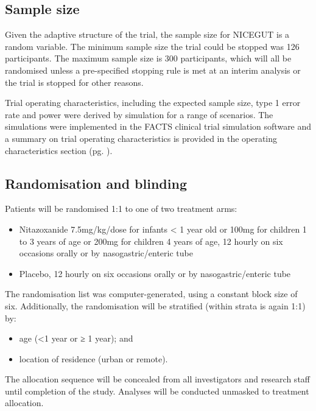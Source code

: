 \documentclass[a4paper]{article}
\begin{document}
\subsection{Sample size}

Given the adaptive structure of the trial, the sample size for NICEGUT is a random variable.
The minimum sample size the trial could be stopped was 126 participants.
The maximum sample size is 300 participants, which will all be randomised unless a pre-specified stopping rule is met at an interim analysis or the trial is stopped for other reasons.

Trial operating characteristics, including the expected sample size, type 1 error rate and power were derived by simulation for a range of scenarios.
The simulations were implemented in the FACTS \cite{facts} clinical trial simulation software and a summary on trial operating characteristics is provided in the operating characteristics section (pg. \pageref{summary-of-operating-characteristics}).

\subsection{Randomisation and blinding}

Patients will be randomised 1:1 to one of two treatment arms: 

\begin{itemize}
    \item Nitazoxanide 7.5mg/kg/dose for infants < 1 year old or 100mg for children 1 to 3 years of age or 200mg for children 4 years of age, 12 hourly on six occasions orally or by nasogastric/enteric tube
    \item Placebo, 12 hourly on six occasions orally or by nasogastric/enteric tube
\end{itemize}

The randomisation list was computer-generated, using a constant block size of six.
Additionally, the randomisation will be stratified (within strata is again 1:1) by:

\begin{itemize}
    \item age (<1 year or ≥ 1 year); and
    \item location of residence (urban or remote).
\end{itemize}

The allocation sequence will be concealed from all investigators and research staff until completion of the study.
Analyses will be conducted unmasked to treatment allocation.
\end{document}
